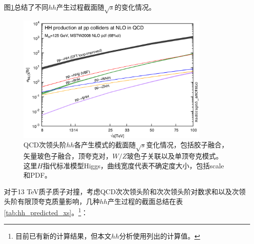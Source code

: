 图\ref{fig:diagram_SMhh_VBF}总结了不同$hh$产生过程截面随$\sqrt{s}$的变化情况。
\begin{figure}[h]
\centering
 \includegraphics[width=0.85\textwidth]{fig/HH-xsec.png}
\caption{QCD次领头阶$hh$各产生模式的截面随$\sqrt{s}$变化情况\cite{Frederix:2014hta}，包括胶子融合，矢量玻色子融合，顶夸克对，$W/Z$玻色子关联以及单顶夸克模式。
这里$H$指代标准模型Higgs，曲线宽度代表不确定度大小，包括scale和PDF。}
\label{fig:diagram_SMhh_VBF}
\end{figure}
对于13 TeV质子质子对撞，考虑QCD次次领头阶和次次领头阶对数求和以及次领头阶有限顶夸克质量影响，几种$hh$产生过程的截面\cite{deFlorian:2016spz}总结在表\ref{tab:hh_predicted_xs}。\footnote{目前已有新的计算结果\cite{Grazzini:2018bsd,deFlorian:2013jea}，但本文$hh$分析使用列出的计算值。}：
\begin{table}[h]
\centering
{}
\caption{13 TeV质心系能量下标准模型$hh$（假设$m_h$= 125.09 GeV, 但对于$gg\rightarrow hhh$,
$m_h$=125 GeV）产生截面理论预测值(fb)。}
\label{tab:hh_predicted_xs}
\end{table}

